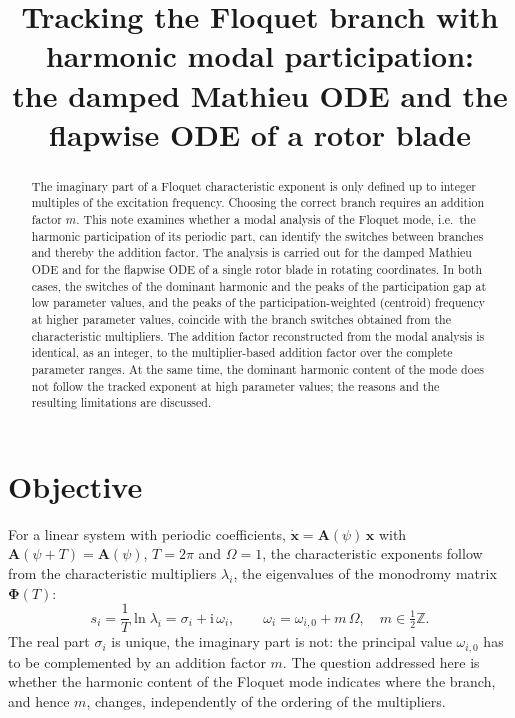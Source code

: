 \documentclass[11pt,a4paper]{article}
\title{Tracking the Floquet branch with harmonic modal participation:\\
the damped Mathieu ODE and the flapwise ODE of a rotor blade}
\author{}
\date{}
\begin{document}
\maketitle

\begin{abstract}
The imaginary part of a Floquet characteristic exponent is only defined up to integer
multiples of the excitation frequency. Choosing the correct branch requires an addition
factor $m$. This note examines whether a modal analysis of the Floquet mode, i.e.\ the
harmonic participation of its periodic part, can identify the switches between branches
and thereby the addition factor. The analysis is carried out for the damped Mathieu ODE
and for the flapwise ODE of a single rotor blade in rotating coordinates. In both cases,
the switches of the dominant harmonic and the peaks of the participation gap at low
parameter values, and the peaks of the participation-weighted (centroid) frequency at
higher parameter values, coincide with the branch switches obtained from the
characteristic multipliers. The addition factor reconstructed from the modal analysis is
identical, as an integer, to the multiplier-based addition factor over the complete
parameter ranges. At the same time, the dominant harmonic content of the mode does not
follow the tracked exponent at high parameter values; the reasons and the resulting
limitations are discussed.
\end{abstract}

\section{Objective}
For a linear system with periodic coefficients, $\dot{\bm{x}} = \bm{A}(\psi)\,\bm{x}$ with
$\bm{A}(\psi + T) = \bm{A}(\psi)$, $T = 2\pi$ and $\Omega = 1$, the characteristic
exponents follow from the characteristic multipliers $\lambda_i$, the eigenvalues of the
monodromy matrix $\bm{\Phi}(T)$:
\begin{equation}
  s_i = \frac{1}{T}\ln \lambda_i = \sigma_i + \mathrm{i}\,\omega_i ,
  \qquad
  \omega_i = \omega_{i,0} + m\,\Omega, \quad m \in \tfrac{1}{2}\mathbb{Z}.
  \label{eq:floquet}
\end{equation}
The real part $\sigma_i$ is unique, the imaginary part is not: the principal value
$\omega_{i,0}$ has to be complemented by an addition factor $m$. The question addressed
here is whether the harmonic content of the Floquet mode indicates where the branch, and
hence $m$, changes, independently of the ordering of the multipliers.
\end{document}
